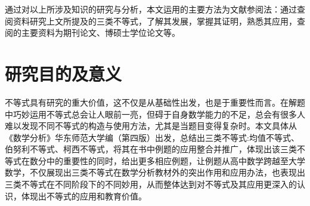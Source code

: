 通过对以上所涉及知识的研究与分析，本文运用的主要方法为文献参阅法：通过查阅资料研究上文所提及的三类不等式，了解其发展，掌握其证明，熟悉其应用，查阅的主要资料为期刊论文、博硕士学位论文等。



\section{研究目的及意义}

不等式具有研究的重大价值，这不仅是从基础性出发，也是于重要性而言。在解题中巧妙运用不等式总会让人眼前一亮，但碍于自身数学能力的不足，总会有很多人难以发现不同不等式的构造与使用方法，尤其是当题目变得复杂时。本文具体从《数学分析》华东师范大学编（第四版）出发，总结出三类不等式:均值不等式、伯努利不等式、柯西不等式，将其在书中例题的应用整合并推广，体现出该三类不等式在数分中的重要性的同时，给出更多相应例题，让例题从高中数学跨越至大学数学，不仅展现出三类不等式在数学分析教材外的突出作用和应用办法，也表现出三类不等式在不同阶段下的不同妙用，从而整体达到对不等式及其应用更深入的认识，体现出不等式的应用和教育价值。